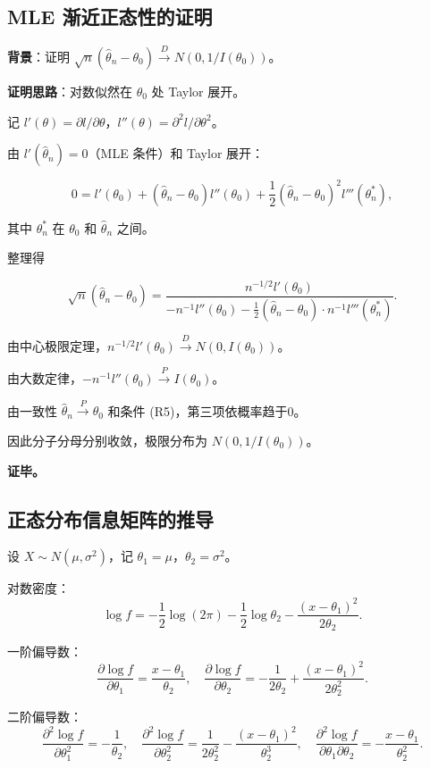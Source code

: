 \subsection{MLE 渐近正态性的证明}\label{sec:mle-asymptotic-proof}

\textbf{背景}：证明 $\sqrt{n}(\widehat{\theta}_n - \theta_0) \xrightarrow{D} N(0, 1/I(\theta_0))$。

\textbf{证明思路}：对数似然在 $\theta_0$ 处 Taylor 展开。

记 $l'(\theta) = \partial l/\partial \theta$，$l''(\theta) = \partial^2 l/\partial \theta^2$。

由 $l'(\widehat{\theta}_n) = 0$（MLE 条件）和 Taylor 展开：

\[
0 = l'(\theta_0) + (\widehat{\theta}_n - \theta_0)l''(\theta_0) + \frac{1}{2}(\widehat{\theta}_n - \theta_0)^2 l'''(\theta_n^*),
\]

其中 $\theta_n^*$ 在 $\theta_0$ 和 $\widehat{\theta}_n$ 之间。

整理得

\[
\sqrt{n}(\widehat{\theta}_n - \theta_0) = \frac{n^{-1/2}l'(\theta_0)}{-n^{-1}l''(\theta_0) - \frac{1}{2}(\widehat{\theta}_n - \theta_0) \cdot n^{-1}l'''(\theta_n^*)}.
\]

由中心极限定理，$n^{-1/2}l'(\theta_0) \xrightarrow{D} N(0, I(\theta_0))$。

由大数定律，$-n^{-1}l''(\theta_0) \xrightarrow{P} I(\theta_0)$。

由一致性 $\widehat{\theta}_n \xrightarrow{P} \theta_0$ 和条件 (R5)，第三项依概率趋于0。

因此分子分母分别收敛，极限分布为 $N(0, 1/I(\theta_0))$。

\textbf{证毕。}

\subsection{正态分布信息矩阵的推导}\label{sec:normal-information-matrix-derivation}

设 $X \sim N(\mu, \sigma^2)$，记 $\theta_1 = \mu$，$\theta_2 = \sigma^2$。

对数密度：
\[
\log f = -\frac{1}{2}\log(2\pi) - \frac{1}{2}\log\theta_2 - \frac{(x-\theta_1)^2}{2\theta_2}.
\]

一阶偏导数：
\[
\frac{\partial \log f}{\partial \theta_1} = \frac{x-\theta_1}{\theta_2}, \quad
\frac{\partial \log f}{\partial \theta_2} = -\frac{1}{2\theta_2} + \frac{(x-\theta_1)^2}{2\theta_2^2}.
\]

二阶偏导数：
\[
\frac{\partial^2 \log f}{\partial \theta_1^2} = -\frac{1}{\theta_2}, \quad
\frac{\partial^2 \log f}{\partial \theta_2^2} = \frac{1}{2\theta_2^2} - \frac{(x-\theta_1)^2}{\theta_2^3}, \quad
\frac{\partial^2 \log f}{\partial \theta_1\partial\theta_2} = -\frac{x-\theta_1}{\theta_2^2}.
\]

